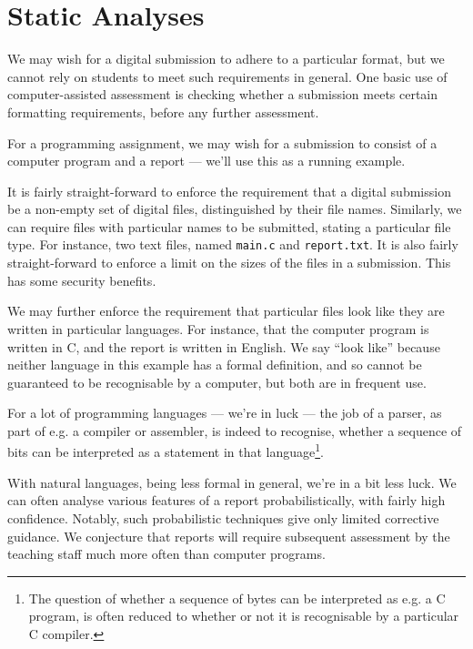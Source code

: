 
\section{Static Analyses}

We may wish for a digital submission to adhere to a particular format, but we
cannot rely on students to meet such requirements in general. One basic use of
computer-assisted assessment is checking whether a submission meets certain
formatting requirements, before any further assessment.

For a programming assignment, we may wish for a submission to consist of a
computer program and a report --- we'll use this as a running example.

It is fairly straight-forward to enforce the requirement that a digital
submission be a non-empty set of digital files, distinguished by their file
names. Similarly, we can require files with particular names to be submitted,
stating a particular file type.  For instance, two text files, named
\texttt{main.c} and \texttt{report.txt}. It is also fairly straight-forward to
enforce a limit on the sizes of the files in a submission.  This has some
security benefits. %

We may further enforce the requirement that particular files look like they are
written in particular languages. For instance, that the computer program is
written in C, and the report is written in English. We say ``look like''
because neither language in this example has a formal definition, and so cannot
be guaranteed to be recognisable by a computer, but both are in frequent use.

For a lot of programming languages --- we're in luck --- the job of a parser,
as part of e.g. a compiler or assembler, is indeed to recognise, whether a
sequence of bits can be interpreted as a statement in that
language\footnote{The question of whether a sequence of bytes can be
interpreted as e.g. a C program, is often reduced to whether or not it is
recognisable by a particular C compiler.}.

With natural languages, being less formal in general, we're in a bit less luck.
We can often analyse various features of a report probabilistically, with
fairly high confidence. Notably, such probabilistic techniques give only
limited corrective guidance. We conjecture that reports will require subsequent
assessment by the teaching staff much more often than computer programs.

